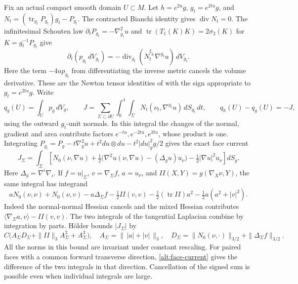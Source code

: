 Fix an actual compact smooth domain \(U\subset M\).
Let \(h=e^{2u}g\), \(g_t=e^{2tu}g\), and
\(N_t=(\operatorname{tr}_{g_t}P_{g_t})g_t-P_{g_t}\).
The contracted Bianchi identity gives \(\operatorname{div}N_t=0\).
The infinitesimal Schouten law
\(\partial_tP_{g_t}=-\nabla^2_{g_t}u\) and
\(\operatorname{tr}(T_1(K)K)=2\sigma_2(K)\) for
\(K=g_t^{-1}P_{g_t}\) give
\begin{equation}\label{alt:newton}
 \partial_t(p_{g_t}\,dV_{g_t})
 =-\operatorname{div}_{g_t}(N_t^{\sharp_{g_t}}\nabla^{g_t}u)\,dV_{g_t}.
\end{equation}
Here the term \(-4up_{g_t}\) from differentiating the inverse
metric cancels the volume derivative. These are the Newton tensor
identities of \cite[\S2.1, equations (2-1)--(2-5) and Lemma 2.1]{GurskyStreets2018TwoYamabe}
with the sign appropriate to \(g_t=e^{2tu}g\). Write
\[
 q_g(U)=\int_U p_g\,dV_g,\qquad
 J=\sum_{\Sigma\subset\partial U}
   \int_0^1\!\int_\Sigma N_t(\nu_t,\nabla^{g_t}u)\,dS_{g_t}\,dt,
 \qquad q_h(U)-q_g(U)=-J ,
\]
using the outward \(g_t\)-unit normals. In this integral the changes
of the normal, gradient and area contribute factors
\(e^{-tu},e^{-2tu},e^{3tu}\), whose product is one. Integrating
\(P_{g_t}=P_g-t\nabla_g^2 u+t^2du\otimes du
-t^2|du|_g^2g/2\) gives the exact face current
\begin{equation}\label{alt:face-current}
 J_\Sigma=\int_\Sigma\!
  \left[N_0(\nu,\nabla u)
   +\tfrac12\bigl(\nabla^2u(\nu,\nabla u)-(\Delta_g u)u_\nu\bigr)
   -\tfrac12|\nabla u|^2u_\nu\right]dS_g .
\end{equation}
Here \(\Delta_g=\nabla^i\nabla_i\). If \(f=u|_\Sigma\),
\(v=\nabla_\Sigma f\), \(a=u_\nu\), and
\(II(X,Y)=g(\nabla_X\nu,Y)\), the same integral has integrand
\[
 aN_0(\nu,\nu)+N_0(\nu,v)-a\Delta_\Sigma f
 -\tfrac12 II(v,v)-\tfrac12(\operatorname{tr}II)a^2
 -\tfrac12a(a^2+|v|^2).
\]
Indeed the normal-normal Hessian cancels and the mixed Hessian
contributes \(\langle\nabla_\Sigma a,v\rangle-II(v,v)\).
The two integrals of the tangential Laplacian combine by integration
by parts. Hölder bounds \(|J_\Sigma|\) by
\[
 C\bigl(A_\Sigma D_\Sigma+\|II\|_3 A_\Sigma^2+A_\Sigma^3\bigr),
 \quad A_\Sigma=\|\,|a|+|v|\,\|_3,\quad
 D_\Sigma=\|N_0(\nu,\cdot)\|_{3/2}+\|\Delta_\Sigma f\|_{3/2}.
\]
All the norms in this bound are invariant under constant rescaling.
For paired faces with a common forward transverse direction,
\eqref{alt:face-current} gives the difference of the two integrals
in that direction. Cancellation of the signed sum is possible even
when individual integrals are large.

